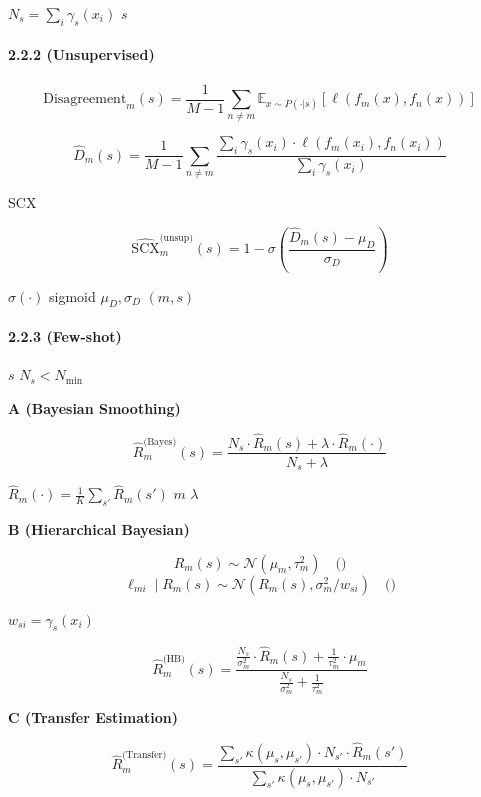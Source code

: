 \documentclass[
  12pt,
]{article}
\begin{document}
 \(N_s = \sum_i \gamma_s(x_i)\)  \(s\) 

\paragraph{2.2.2 
(Unsupervised)}\label{ux65e0ux6807ux7b7eux573aux666f-unsupervised}

\textbf{}

\[
\text{Disagreement}_m(s) = \frac{1}{M-1} \sum_{n \neq m} \mathbb{E}_{x \sim P(\cdot|s)} [\ell(f_m(x), f_n(x))]
\]

 \[
\hat{D}_m(s) = \frac{1}{M-1} \sum_{n \neq m} \frac{\sum_i \gamma_s(x_i) \cdot \ell(f_m(x_i), f_n(x_i))}{\sum_i \gamma_s(x_i)}
\]

\textbf{}


SCX 

\[
\widehat{\text{SCX}}_m^{\text{(unsup)}}(s) = 1 - \sigma\left( \frac{\hat{D}_m(s) - \mu_D}{\sigma_D} \right)
\]

 \(\sigma(\cdot)\)  sigmoid \(\mu_D, \sigma_D\) 
\((m,s)\) 

\paragraph{2.2.3 
(Few-shot)}\label{ux5c0fux6837ux672cux573aux666f-few-shot}

 \(s\)
\(N_s < N_{\min}\)

\textbf{ A (Bayesian Smoothing)}

\[
\hat{R}_m^{\text{(Bayes)}}(s) = \frac{N_s \cdot \hat{R}_m(s) + \lambda \cdot \hat{R}_m(\cdot)}{N_s + \lambda}
\]

 \(\hat{R}_m(\cdot) = \frac{1}{K} \sum_{s'} \hat{R}_m(s')\) 
\(m\) \(\lambda\) 

\textbf{ B (Hierarchical Bayesian)}



\[
R_m(s) \sim \mathcal{N}(\mu_m, \tau_m^2) \quad \text{()}
\] \[
\ell_{mi} \mid R_m(s) \sim \mathcal{N}(R_m(s), \sigma_m^2 / w_{si}) \quad \text{()}
\]

 \(w_{si} = \gamma_s(x_i)\) 

\[
\hat{R}_m^{\text{(HB)}}(s) = \frac{\frac{N_s}{\sigma_m^2} \cdot \hat{R}_m(s) + \frac{1}{\tau_m^2} \cdot \mu_m}{\frac{N_s}{\sigma_m^2} + \frac{1}{\tau_m^2}}
\]

\textbf{ C (Transfer Estimation)}



\[
\hat{R}_m^{\text{(Transfer)}}(s) = \frac{\sum_{s'} \kappa(\mu_s, \mu_{s'}) \cdot N_{s'} \cdot \hat{R}_m(s')}{\sum_{s'} \kappa(\mu_s, \mu_{s'}) \cdot N_{s'}}
\]
\end{document}
